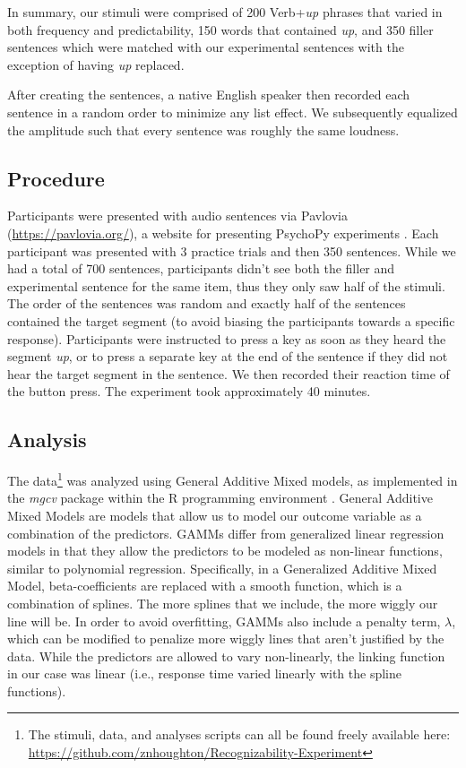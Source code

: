 \documentclass[
  authoryear,
  preprint,
  1p,
  onecolumn]{elsarticle}
\begin{document}
In summary, our stimuli were comprised of 200 Verb+\emph{up} phrases
that varied in both frequency and predictability, 150 words that
contained \emph{up}, and 350 filler sentences which were matched with
our experimental sentences with the exception of having \emph{up}
replaced.

After creating the sentences, a native English speaker then recorded
each sentence in a random order to minimize any list effect. We
subsequently equalized the amplitude such that every sentence was
roughly the same loudness.

\subsection{Procedure}\label{procedure}

Participants were presented with audio sentences via Pavlovia
(\url{https://pavlovia.org/}), a website for presenting PsychoPy
experiments \citep{peircePsychoPy2ExperimentsBehavior2019}. Each
participant was presented with 3 practice trials and then 350 sentences.
While we had a total of 700 sentences, participants didn't see both the
filler and experimental sentence for the same item, thus they only saw
half of the stimuli. The order of the sentences was random and exactly
half of the sentences contained the target segment (to avoid biasing the
participants towards a specific response). Participants were instructed
to press a key as soon as they heard the segment \emph{up}, or to press
a separate key at the end of the sentence if they did not hear the
target segment in the sentence. We then recorded their reaction time of
the button press. The experiment took approximately 40 minutes.

\subsection{Analysis}\label{analysis}

The data\footnote{The stimuli, data, and analyses scripts can all be
  found freely available here:
  \url{https://github.com/znhoughton/Recognizability-Experiment}} was
analyzed using General Additive Mixed models, as implemented in the
\emph{mgcv} package \citep{mgcv} within the R programming environment
\citep{Rpackage}. General Additive Mixed Models are models that allow us
to model our outcome variable as a combination of the predictors. GAMMs
differ from generalized linear regression models in that they allow the
predictors to be modeled as non-linear functions, similar to polynomial
regression. Specifically, in a Generalized Additive Mixed Model,
beta-coefficients are replaced with a smooth function, which is a
combination of splines. The more splines that we include, the more
wiggly our line will be. In order to avoid overfitting, GAMMs also
include a penalty term, \(\lambda\), which can be modified to penalize
more wiggly lines that aren't justified by the data. While the
predictors are allowed to vary non-linearly, the linking function in our
case was linear (i.e., response time varied linearly with the spline
functions).
\end{document}
